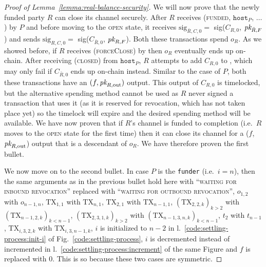 \begin{proof}[Proof of Lemma~\ref{lemma:real-balance-security}]
  We will now prove that the newly funded party $R$ can close its channel
  securely. After $R$ receives (\textsc{funded}, $\texttt{host}_P$, $\dots$) by
  $P$ and before moving to the \textsc{open} state, it receives
  $\mathrm{sig}_{\bar{R}, C, 0} =$ sig($C_{R, 0}$, $\textit{pk}_{\bar{R}, F}$) and sends
  $\mathrm{sig}_{R, C, 0} =$ sig($C_{\bar{R}, 0}$, $\textit{pk}_{R, F}$). Both these
  transactions spend $o_R$. As we showed before, if $R$ receives
  (\textsc{forceClose}) by \environment then $o_R$ eventually ends up on-chain. After
  receiving (\textsc{closed}) from $\texttt{host}_P$, $R$ attempts to add $C_{R,
  0}$ to \ledger, which may only fail if $C_{\bar{R}, 0}$ ends up on-chain
  instead. Similar to the case of $P$, both these transactions have an $(f,
  \textit{pk}_{R, \mathrm{out}})$ output. This output of $C_{R, 0}$ is timelocked, but
  the alternative spending method cannot be used as $R$ never signed a
  transaction that uses it (as it is reserved for revocation, which has not
  taken place yet) so the timelock will expire and the desired spending method
  will be available. We have now proven that if $R$'s channel is funded to
  completion (i.e.\ $R$ moves to the \textsc{open} state for the first time) then
  it can close its channel for a ($f$, $\textit{pk}_{R, \mathrm{out}}$) output that is a
  descendant of $o_R$. We have therefore proven the first bullet.

  We now move on to the second bullet. In case $P$ is the \texttt{funder} (i.e.\
  $i=n$), then the same arguments as in the previous bullet hold here with
  ``\textsc{waiting for inbound revocation}'' replaced with ``\textsc{waiting
  for outbound revocation}'', $o_{1, 2}$ with $o_{n-1, n}$, $\mathrm{TX}_{1, 1}$
  with $\mathrm{TX}_{n, 1}$, $\mathrm{TX}_{2, 1}$ with $\mathrm{TX}_{n-1, 1}$,
  $(\mathrm{TX}_{2, 2, k})_{k > 2}$ with $(\mathrm{TX}_{n-1, 2, k})_{k < n-1}$,
  $(\mathrm{TX}_{2, 3, 1, k})_{k > 2}$ with $(\mathrm{TX}_{n-1, 3, n, k})_{k <
  n-1}$, $t_2$ with $t_{n-1}$, $\mathrm{TX}_{i, 3, 2, k}$ with $\mathrm{TX}_{i,
  3, n-1, k}$, $i$ is initialized to $n-2$ in
  l.~\ref{code:settling-process:init-i} of Fig.~\ref{code:settling-process}, $i$
  is decremented instead of incremented in
  l.~\ref{code:settling-process:increment} of the same Figure and $f$ is
  replaced with $0$. This is so because these two cases are symmetric.


\end{proof}
